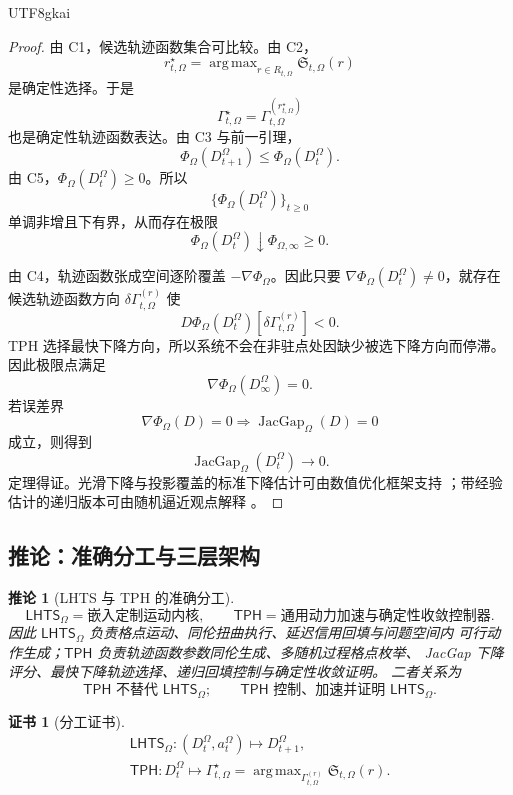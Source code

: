\documentclass[12pt]{article}
\newtheorem{corollary}{推论}[section]
\newtheorem{Certificate}{证书}[section]
\newcommand{\LHTS}{\ensuremath{\mathsf{LHTS}}}
\newcommand{\TPH}{\ensuremath{\mathsf{TPH}}}
\DeclareMathOperator{\JacGap}{JacGap}
\DeclareMathOperator*{\argmax}{arg\,max}
\begin{document}
\begin{CJK*}{UTF8}{gkai}
\begin{proof}
由 C1，候选轨迹函数集合可比较。由 C2，
\[
r_{t,\Omega}^\star
=
\argmax_{r\in R_{t,\Omega}}\mathfrak S_{t,\Omega}(r)
\]
是确定性选择。于是
\[
\Gamma_{t,\Omega}^\star
=
\Gamma_{t,\Omega}^{(r_{t,\Omega}^\star)}
\]
也是确定性轨迹函数表达。由 C3 与前一引理，
\[
\Phi_\Omega(D_{t+1}^\Omega)\le\Phi_\Omega(D_t^\Omega).
\]
由 C5，\(\Phi_\Omega(D_t^\Omega)\ge0\)。所以
\[
\{\Phi_\Omega(D_t^\Omega)\}_{t\ge0}
\]
单调非增且下有界，从而存在极限
\[
\Phi_\Omega(D_t^\Omega)\downarrow\Phi_{\Omega,\infty}\ge0.
\]

由 C4，轨迹函数张成空间逐阶覆盖 \(-\nabla\Phi_\Omega\)。因此只要
\(\nabla\Phi_\Omega(D_t^\Omega)\ne0\)，就存在候选轨迹函数方向
\(\delta\Gamma_{t,\Omega}^{(r)}\) 使
\[
D\Phi_\Omega(D_t^\Omega)[\delta\Gamma_{t,\Omega}^{(r)}]<0.
\]
TPH 选择最快下降方向，所以系统不会在非驻点处因缺少被选下降方向而停滞。
因此极限点满足
\[
\nabla\Phi_\Omega(D_\infty^\Omega)=0.
\]
若误差界
\[
\nabla\Phi_\Omega(D)=0\Rightarrow\JacGap_\Omega(D)=0
\]
成立，则得到
\[
\JacGap_\Omega(D_t^\Omega)\to0.
\]
定理得证。光滑下降与投影覆盖的标准下降估计可由数值优化框架支持
\cite{NocedalWright2006Optimization}；带经验估计的递归版本可由随机逼近观点解释
\cite{KushnerYin2003StochasticApproximation,Borkar2008StochasticApproximation}。
\end{proof}

\subsection{推论：准确分工与三层架构}
\label{subsec:division-three-layer-architecture}

\begin{corollary}[LHTS 与 TPH 的准确分工]
\[
\boxed{
\LHTS_\Omega
=
\text{嵌入定制运动内核},
\qquad
\TPH
=
\text{通用动力加速与确定性收敛控制器}.
}
\]
因此 \(\LHTS_\Omega\) 负责格点运动、同伦扭曲执行、延迟信用回填与问题空间内
可行动作生成；\(\TPH\) 负责轨迹函数参数同伦生成、多随机过程格点枚举、
JacGap 下降评分、最快下降轨迹选择、递归回填控制与确定性收敛证明。
二者关系为
\[
\boxed{
\TPH\text{ 不替代 }\LHTS_\Omega;
\qquad
\TPH\text{ 控制、加速并证明 }\LHTS_\Omega.
}
\]
\end{corollary}

\begin{Certificate}[分工证书]
\[
\boxed{
\begin{gathered}
\LHTS_\Omega:
(D_t^\Omega,a_t^\Omega)\mapsto D_{t+1}^\Omega,
\\
\TPH:
D_t^\Omega
\mapsto
\Gamma_{t,\Omega}^\star
=
\argmax_{\Gamma_{t,\Omega}^{(r)}}
\mathfrak S_{t,\Omega}(r).
\end{gathered}
}
\]
\end{Certificate}


\end{CJK*}
\end{document}
